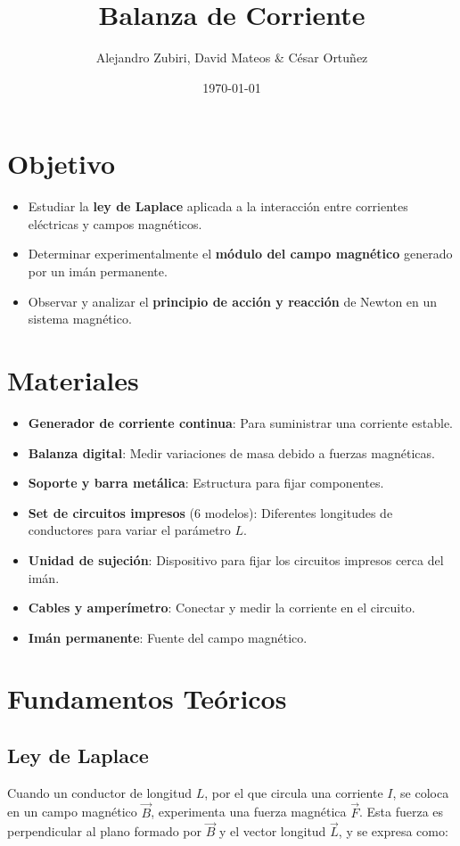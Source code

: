 \documentclass{article}
\title{Balanza de Corriente}
\author{Alejandro Zubiri, David Mateos \& César Ortuñez}
\date{\today}
\begin{document}
\maketitle
\tableofcontents
\pagebreak
\section{Objetivo}
\begin{itemize}
    \item Estudiar la \textbf{ley de Laplace} aplicada a la interacción entre corrientes eléctricas y campos magnéticos.
    \item Determinar experimentalmente el \textbf{módulo del campo magnético} generado por un imán permanente.
    \item Observar y analizar el \textbf{principio de acción y reacción} de Newton en un sistema magnético.
\end{itemize}

\section{Materiales}
\begin{itemize}
    \item \textbf{Generador de corriente continua}: Para suministrar una corriente estable.
    \item \textbf{Balanza digital}: Medir variaciones de masa debido a fuerzas magnéticas.
    \item \textbf{Soporte y barra metálica}: Estructura para fijar componentes.
    \item \textbf{Set de circuitos impresos} (6 modelos): Diferentes longitudes de conductores para variar el parámetro \( L \).
    \item \textbf{Unidad de sujeción}: Dispositivo para fijar los circuitos impresos cerca del imán.
    \item \textbf{Cables y amperímetro}: Conectar y medir la corriente en el circuito.
    \item \textbf{Imán permanente}: Fuente del campo magnético.
\end{itemize}

\section{Fundamentos Teóricos}
\subsection{Ley de Laplace}
Cuando un conductor de longitud \( L \), por el que circula una corriente \( I \), se coloca en un campo magnético \( \vec{B} \), experimenta una fuerza magnética \( \vec{F} \). Esta fuerza es perpendicular al plano formado por \( \vec{B} \) y el vector longitud \( \vec{L} \), y se expresa como:
\end{document}
